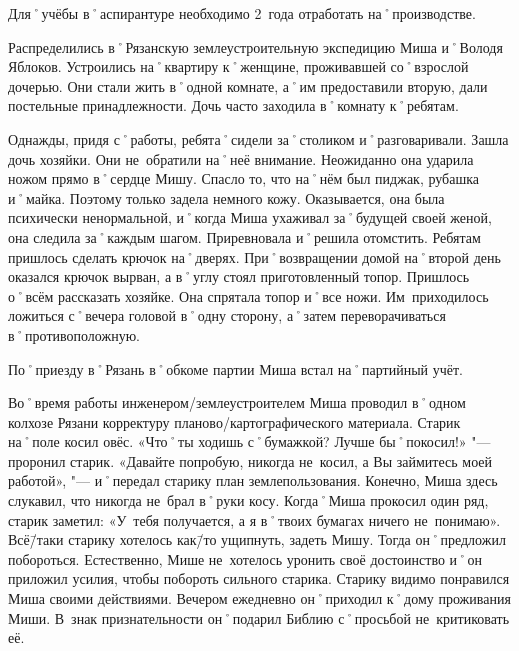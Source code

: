 Для˚учёбы в˚аспирантуре необходимо 2~года отработать на˚производстве.

Распределились в˚Рязанскую землеустроительную экспедицию Миша и˚Володя Яблоков. Устроились на˚квартиру к˚женщине, проживавшей со˚взрослой дочерью. Они стали жить в˚одной комнате, а˚им предоставили вторую, дали постельные принадлежности. Дочь часто заходила в˚комнату к˚ребятам.

Однажды, придя с˚работы, ребята˚сидели за˚столиком и˚разговаривали. Зашла дочь хозяйки. Они не~обратили на˚неё внимание. Неожиданно она ударила ножом прямо в˚сердце Мишу. Спасло то, что на˚нём был пиджак, рубашка и˚майка. Поэтому только задела немного кожу. Оказывается, она была психически ненормальной, и˚когда Миша ухаживал за˚будущей своей женой, она следила за˚каждым шагом. Приревновала и˚решила отомстить. Ребятам пришлось сделать крючок на˚дверях. При˚возвращении домой на˚второй день оказался крючок вырван, а в˚углу стоял приготовленный топор. Пришлось о˚всём рассказать хозяйке. Она спрятала топор и˚все ножи. Им~приходилось ложиться с˚вечера головой в˚одну сторону, а˚затем переворачиваться в˚противоположную.

По˚приезду в˚Рязань в˚обкоме партии Миша встал на˚партийный учёт.

Во˚время работы инженером\-/землеустроителем Миша проводил в˚одном колхозе Рязани корректуру планово\-/картографического материала. Старик на˚поле косил овёс. «Что˚ты ходишь с˚бумажкой? Лучше бы˚покосил!» "--- проронил старик. «Давайте попробую, никогда не~косил, а Вы займитесь моей работой», "--- и˚передал старику план землепользования. Конечно, Миша здесь слукавил, что никогда не~брал в˚руки косу. Когда˚Миша прокосил один ряд, старик заметил: «У~тебя получается, а я в˚твоих бумагах ничего не~понимаю». Всё\=/таки старику хотелось как\=/то ущипнуть, задеть Мишу. Тогда он˚предложил побороться. Естественно, Мише не~хотелось уронить своё достоинство и˚он приложил усилия, чтобы побороть сильного старика. Старику видимо понравился Миша своими действиями. Вечером ежедневно он˚приходил к˚дому проживания Миши. В~знак признательности он˚подарил Библию с˚просьбой не~критиковать её.

